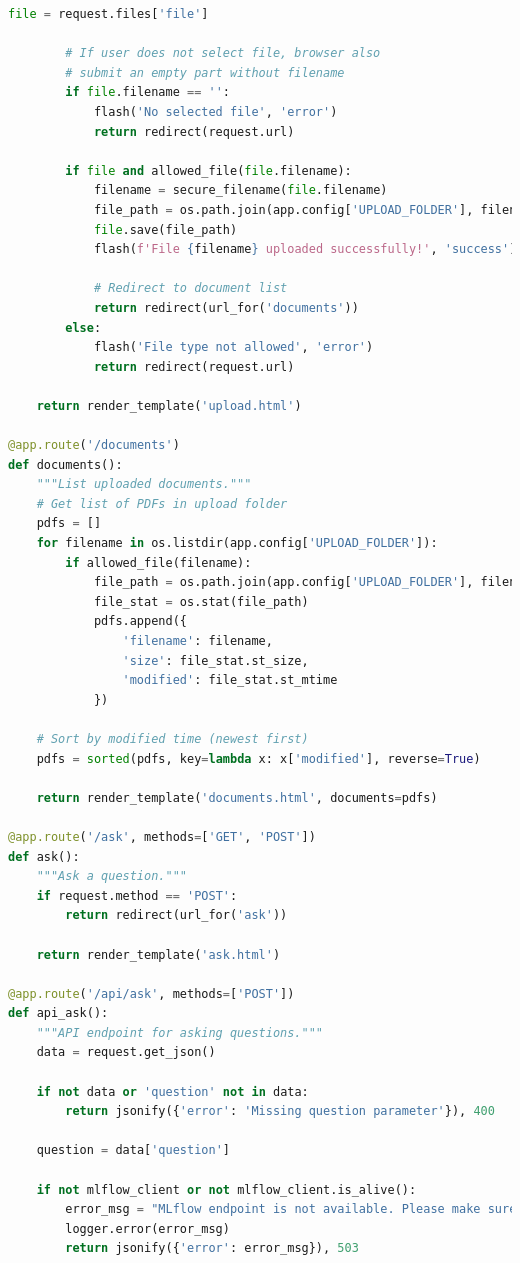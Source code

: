 \documentclass[
  screen,review,acmlarge]{acmart}
\begin{document}
\begin{lstlisting}[language=Python]
        file = request.files['file']
        
        # If user does not select file, browser also
        # submit an empty part without filename
        if file.filename == '':
            flash('No selected file', 'error')
            return redirect(request.url)
        
        if file and allowed_file(file.filename):
            filename = secure_filename(file.filename)
            file_path = os.path.join(app.config['UPLOAD_FOLDER'], filename)
            file.save(file_path)
            flash(f'File {filename} uploaded successfully!', 'success')
            
            # Redirect to document list
            return redirect(url_for('documents'))
        else:
            flash('File type not allowed', 'error')
            return redirect(request.url)
    
    return render_template('upload.html')

@app.route('/documents')
def documents():
    """List uploaded documents."""
    # Get list of PDFs in upload folder
    pdfs = []
    for filename in os.listdir(app.config['UPLOAD_FOLDER']):
        if allowed_file(filename):
            file_path = os.path.join(app.config['UPLOAD_FOLDER'], filename)
            file_stat = os.stat(file_path)
            pdfs.append({
                'filename': filename,
                'size': file_stat.st_size,
                'modified': file_stat.st_mtime
            })
    
    # Sort by modified time (newest first)
    pdfs = sorted(pdfs, key=lambda x: x['modified'], reverse=True)
    
    return render_template('documents.html', documents=pdfs)

@app.route('/ask', methods=['GET', 'POST'])
def ask():
    """Ask a question."""
    if request.method == 'POST':
        return redirect(url_for('ask'))
    
    return render_template('ask.html')

@app.route('/api/ask', methods=['POST'])
def api_ask():
    """API endpoint for asking questions."""
    data = request.get_json()
    
    if not data or 'question' not in data:
        return jsonify({'error': 'Missing question parameter'}), 400
    
    question = data['question']
    
    if not mlflow_client or not mlflow_client.is_alive():
        error_msg = "MLflow endpoint is not available. Please make sure the model is deployed."
        logger.error(error_msg)
        return jsonify({'error': error_msg}), 503
    

\end{lstlisting}
\end{document}
